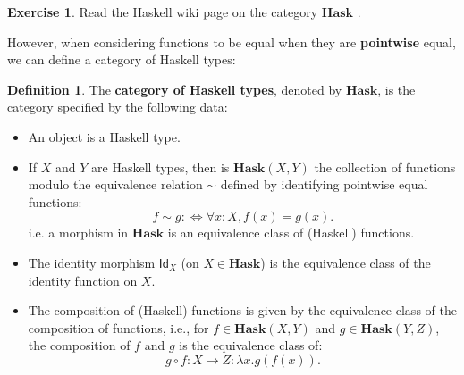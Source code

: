 \documentclass[a4paper,11pt, oneside,titlepage=false]{scrbook}
\theoremstyle{plain}
\theoremstyle{definition}
\newtheorem{dfn}[thm]{Definition}
\newtheorem{exer}[thm]{Exercise}
\newcommand{\cfont}[1]{\ensuremath{\mathsf{#1}}}
\newcommand{\Catb}[1]{\mathbf{#1}}
\newcommand{\HASK}{\Catb{Hask}}
\newcommand{\CHom}[3]{{#1}(#2,#3)}
\newcommand{\Id}[1][]{\cfont{Id}_{#1}}
\begin{document}

\begin{exer}
  Read the Haskell wiki page on the category $\HASK$ \cite{haskell-wiki-hask}.
\end{exer}


However, when considering functions to be equal when they are \textbf{pointwise} equal, we can define a category of Haskell types:
\begin{dfn}\label{example:hask} The \textbf{category of Haskell types}, denoted by $\HASK$, is the category specified by the following data:
\begin{itemize}
\item An object is a Haskell type.
\item If $X$ and $Y$ are Haskell types, then is $\CHom \HASK X Y$ the collection of functions modulo the equivalence relation $\sim$ defined by identifying pointwise equal functions:
\[
f \sim g :\iff \forall x : X, f(x) = g(x).
\]
i.e. a morphism in $\HASK$ is an equivalence class of (Haskell) functions.
\item The identity morphism $\Id[X]$ (on $X\in\HASK$) is the equivalence class of the identity function on $X$.
\item The composition of (Haskell) functions is given by the equivalence class of the composition of functions, i.e., for $f\in \CHom \HASK X Y$ and $g\in \CHom \HASK Y Z$, the composition of $f$ and $g$ is the equivalence class of:
\[g\circ f : X\to Z: \lambda x. g(f(x)).\]
\end{itemize}
\end{dfn}
\end{document}
